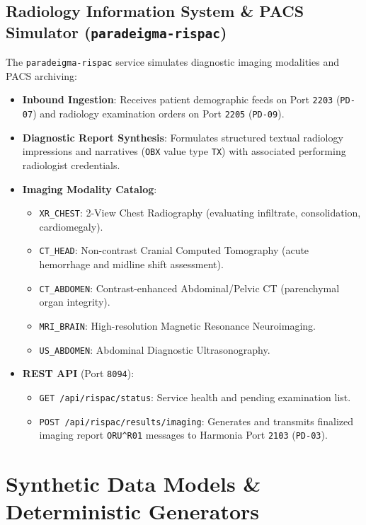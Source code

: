 \subsection{Radiology Information System \& PACS Simulator (\texttt{paradeigma-rispac})}

The \texttt{paradeigma-rispac} service simulates diagnostic imaging modalities and PACS archiving:
\begin{itemize}
    \item \textbf{Inbound Ingestion}: Receives patient demographic feeds on Port \texttt{2203} (\texttt{PD-07}) and radiology examination orders on Port \texttt{2205} (\texttt{PD-09}).
    \item \textbf{Diagnostic Report Synthesis}: Formulates structured textual radiology impressions and narratives (\texttt{OBX} value type \texttt{TX}) with associated performing radiologist credentials.
    \item \textbf{Imaging Modality Catalog}:
    \begin{itemize}
        \item \texttt{XR\_CHEST}: 2-View Chest Radiography (evaluating infiltrate, consolidation, cardiomegaly).
        \item \texttt{CT\_HEAD}: Non-contrast Cranial Computed Tomography (acute hemorrhage and midline shift assessment).
        \item \texttt{CT\_ABDOMEN}: Contrast-enhanced Abdominal/Pelvic CT (parenchymal organ integrity).
        \item \texttt{MRI\_BRAIN}: High-resolution Magnetic Resonance Neuroimaging.
        \item \texttt{US\_ABDOMEN}: Abdominal Diagnostic Ultrasonography.
    \end{itemize}
    \item \textbf{REST API} (Port \texttt{8094}):
    \begin{itemize}
        \item \texttt{GET /api/rispac/status}: Service health and pending examination list.
        \item \texttt{POST /api/rispac/results/imaging}: Generates and transmits finalized imaging report \texttt{ORU\^{}R01} messages to Harmonia Port \texttt{2103} (\texttt{PD-03}).
    \end{itemize}
\end{itemize}

\section{Synthetic Data Models \& Deterministic Generators}
\label{sec:paradeigma_models}

